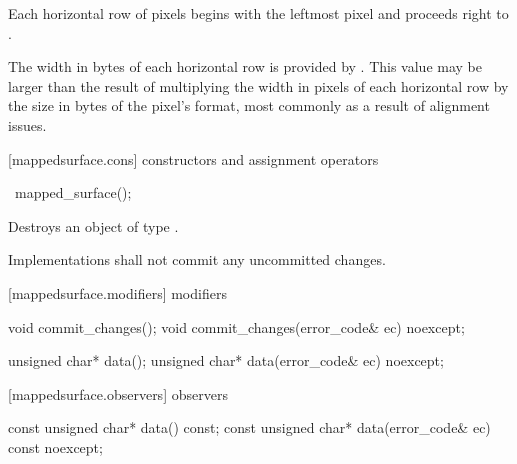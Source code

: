 \pnum
Each horizontal row of pixels begins with the leftmost pixel and proceeds right to .

\pnum
The width in bytes of each horizontal row is provided by . This value may be larger than the result of multiplying the width in pixels of each horizontal row by the size in bytes of the pixel's format, most commonly as a result of alignment issues.

 [mappedsurface.cons] { constructors and assignment operators}

\begin{itemdecl}
    ~mapped_surface();
\end{itemdecl}
\begin{itemdescr}
	\pnum
	\effects
	Destroys an object of type . 
	
	\pnum
	\remarks
	Implementations shall not commit any uncommitted changes.
		
\end{itemdescr}

 [mappedsurface.modifiers]{ modifiers}

\begin{itemdecl}
    void commit_changes();
    void commit_changes(error_code& ec) noexcept;
\end{itemdecl}
\begin{itemdescr}
	\pnum
	\postconditions
	
\end{itemdescr}

\begin{itemdecl}
    unsigned char* data();
    unsigned char* data(error_code& ec) noexcept;
\end{itemdecl}
\begin{itemdescr}
	\pnum
	\postconditions
	
\end{itemdescr}

 [mappedsurface.observers]{ observers}

\begin{itemdecl}
    const unsigned char* data() const;
    const unsigned char* data(error_code& ec) const noexcept;
\end{itemdecl}
\begin{itemdescr}
	\pnum
	\returns

\end{itemdescr}

